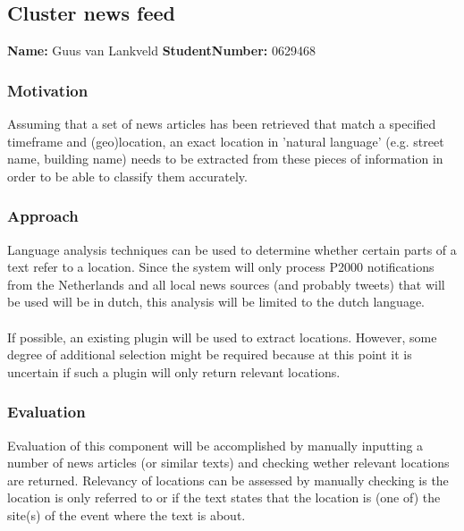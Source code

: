 \subsection{Cluster news feed}
\textbf{Name:}  Guus van Lankveld \indent \textbf{StudentNumber:} 0629468

\subsubsection*{Motivation}
Assuming that a set of news articles has been retrieved that match a specified timeframe and (geo)location, an exact location in 'natural language' (e.g. street name, building name) needs to be extracted from these pieces of information in order to be able to classify them accurately. 

\subsubsection*{Approach}
Language analysis techniques can be used to determine whether certain parts of a text refer to a location. Since the system will only process P2000 notifications from the Netherlands and all local news sources (and probably tweets) that will be used will be in dutch, this analysis will be limited to the dutch language.\\\\
If possible, an existing plugin will be used to extract locations. However, some degree of additional selection might be required because at this point it is uncertain if such a plugin will only return relevant locations.

\subsubsection*{Evaluation }
Evaluation of this component will be accomplished by manually inputting a number of news articles (or similar texts) and checking wether relevant locations are returned. Relevancy of locations can be assessed by manually checking is the location is only referred to or if the text states that the location is (one of) the site(s) of the event where the text is about.